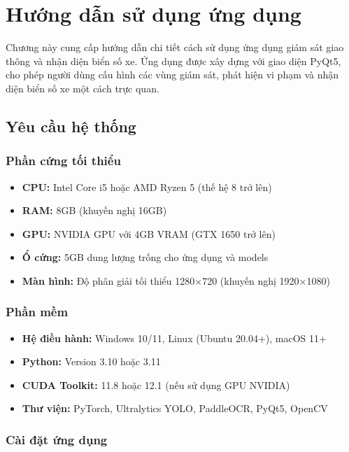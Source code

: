 \chapter{Hướng dẫn sử dụng ứng dụng}
\label{ch:huong_dan_su_dung}

Chương này cung cấp hướng dẫn chi tiết cách sử dụng ứng dụng giám sát giao thông và nhận diện biển số xe. Ứng dụng được xây dựng với giao diện PyQt5, cho phép người dùng cấu hình các vùng giám sát, phát hiện vi phạm và nhận diện biển số xe một cách trực quan.

\section{Yêu cầu hệ thống}

\subsection{Phần cứng tối thiểu}
\begin{itemize}
    \item \textbf{CPU:} Intel Core i5 hoặc AMD Ryzen 5 (thế hệ 8 trở lên)
    \item \textbf{RAM:} 8GB (khuyến nghị 16GB)
    \item \textbf{GPU:} NVIDIA GPU với 4GB VRAM (GTX 1650 trở lên)
    \item \textbf{Ổ cứng:} 5GB dung lượng trống cho ứng dụng và models
    \item \textbf{Màn hình:} Độ phân giải tối thiểu 1280×720 (khuyến nghị 1920×1080)
\end{itemize}

\subsection{Phần mềm}
\begin{itemize}
    \item \textbf{Hệ điều hành:} Windows 10/11, Linux (Ubuntu 20.04+), macOS 11+
    \item \textbf{Python:} Version 3.10 hoặc 3.11
    \item \textbf{CUDA Toolkit:} 11.8 hoặc 12.1 (nếu sử dụng GPU NVIDIA)
    \item \textbf{Thư viện:} PyTorch, Ultralytics YOLO, PaddleOCR, PyQt5, OpenCV
\end{itemize}

\subsection{Cài đặt ứng dụng}

